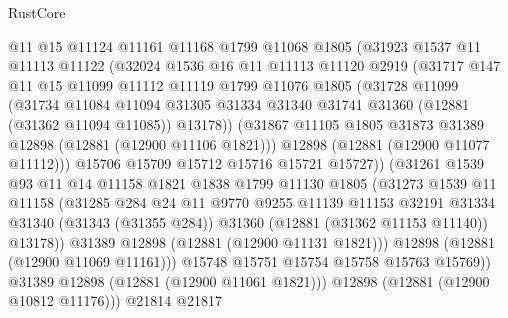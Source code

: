 \begin{lexlean}{RustCore}
\begin{coremodule}
              @11
              @15
              @11124
              @11161
              @11168
              @1799
              @11068
              @1805
              (@31923
                @1537
                @11
                @11113
                @11122
                (@32024
                  @1536
                  @16
                  @11
                  @11113
                  @11120
                  @2919
                  (@31717
                    @147
                    @11
                    @15
                    @11099
                    @11112
                    @11119
                    @1799
                    @11076
                    @1805
                    (@31728
                      @11099
                      (@31734
                        @11084
                        @11094
                        @31305
                        @31334
                        @31340
                        @31741
                        @31360
                        (@12881 (@31362 @11094 @11085))
                        @13178))
                    (@31867 @11105 @1805 @31873 @31389 @12898 (@12881 (@12900 @11106 @1821)))
                    @12898
                    (@12881 (@12900 @11077 @11112)))
                  @15706
                  @15709
                  @15712
                  @15716
                  @15721
                  @15727))
              (@31261
                @1539
                @93
                @11
                @14
                @11158
                @1821
                @1838
                @1799
                @11130
                @1805
                (@31273
                  @1539
                  @11
                  @11158
                  (@31285
                    @284
                    @24
                    @11
                    @9770
                    @9255
                    @11139
                    @11153
                    @32191
                    @31334
                    @31340
                    (@31343 (@31355 @284))
                    @31360
                    (@12881 (@31362 @11153 @11140))
                    @13178))
                @31389
                @12898
                (@12881 (@12900 @11131 @1821)))
              @12898
              (@12881 (@12900 @11069 @11161)))
            @15748
            @15751
            @15754
            @15758
            @15763
            @15769))
        @31389
        @12898
        (@12881 (@12900 @11061 @1821)))
      @12898
      (@12881 (@12900 @10812 @11176)))
    @21814
    @21817

\end{coremodule}
\end{lexlean}
